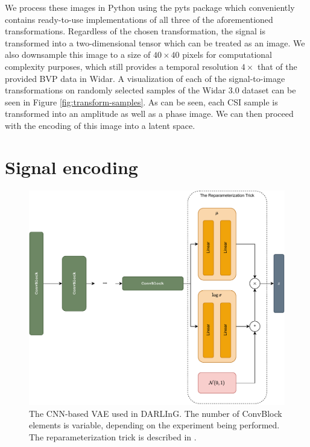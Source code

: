 We process these images in Python using the pyts package \cite{faouzi2020pyts} which conveniently contains ready-to-use implementations of all three of the aforementioned transformations.
Regardless of the chosen transformation, the signal is transformed into a two-dimensional tensor which can be treated as an image.
We also downsample this image to a size of $40 \times 40$ pixels for computational complexity purposes, which still provides a temporal resolution $4 \times$ that of the provided BVP data in Widar.
A visualization of each of the signal-to-image transformations on randomly selected samples of the Widar 3.0 dataset can be seen in Figure \ref{fig:transform-samples}.
As can be seen, each CSI sample is transformed into an amplitude as well as a phase image.
We can then proceed with the encoding of this image into a latent space.

\section{Signal encoding}\label{sec:methodology-signal-encoding}

\begin{figure}
	\centering
	\includegraphics[width=\textwidth]{figures/vae-diagram}
	\caption{The CNN-based VAE used in DARLInG. The number of ConvBlock elements is variable, depending on the experiment being performed. The reparameterization trick is described in \cite{kingma2013auto}.}\label{fig:vae-diagram}
\end{figure}

